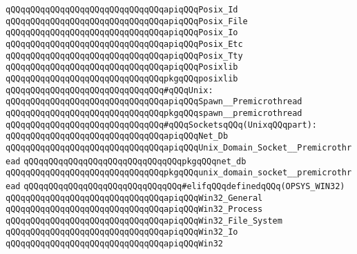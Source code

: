\verb|qQQqqQQqqQQqqQQqqQQqqQQqqQQqqQQqapiqQQqPosix_Id|\newline
\verb|qQQqqQQqqQQqqQQqqQQqqQQqqQQqqQQqapiqQQqPosix_File|\newline
\verb|qQQqqQQqqQQqqQQqqQQqqQQqqQQqqQQqapiqQQqPosix_Io|\newline
\verb|qQQqqQQqqQQqqQQqqQQqqQQqqQQqqQQqapiqQQqPosix_Etc|\newline
\verb|qQQqqQQqqQQqqQQqqQQqqQQqqQQqqQQqapiqQQqPosix_Tty|\newline
\verb|qQQqqQQqqQQqqQQqqQQqqQQqqQQqqQQqapiqQQqPosixlib|\newline
\newline
\verb|qQQqqQQqqQQqqQQqqQQqqQQqqQQqqQQqpkgqQQqposixlib|\newline
\newline
\verb|qQQqqQQqqQQqqQQqqQQqqQQqqQQqqQQq#qQQqUnix:|\newline
\verb|qQQqqQQqqQQqqQQqqQQqqQQqqQQqqQQqapiqQQqSpawn__Premicrothread|\newline
\verb|qQQqqQQqqQQqqQQqqQQqqQQqqQQqqQQqpkgqQQqspawn__premicrothread|\newline
\newline
\verb|qQQqqQQqqQQqqQQqqQQqqQQqqQQqqQQq#qQQqSocketsqQQq(UnixqQQqpart):|\newline
\verb|qQQqqQQqqQQqqQQqqQQqqQQqqQQqqQQqapiqQQqNet_Db|\newline
\verb|qQQqqQQqqQQqqQQqqQQqqQQqqQQqqQQqapiqQQqUnix_Domain_Socket__Premicrothread|\newline
\newline
\verb|qQQqqQQqqQQqqQQqqQQqqQQqqQQqqQQqpkgqQQqnet_db|\newline
\verb|qQQqqQQqqQQqqQQqqQQqqQQqqQQqqQQqpkgqQQqunix_domain_socket__premicrothread|\newline
\newline
\verb|qQQqqQQqqQQqqQQqqQQqqQQqqQQqqQQq#elifqQQqdefinedqQQq(OPSYS_WIN32)|\newline
\newline
\newline
\verb|qQQqqQQqqQQqqQQqqQQqqQQqqQQqqQQqapiqQQqWin32_General|\newline
\verb|qQQqqQQqqQQqqQQqqQQqqQQqqQQqqQQqapiqQQqWin32_Process|\newline
\verb|qQQqqQQqqQQqqQQqqQQqqQQqqQQqqQQqapiqQQqWin32_File_System|\newline
\verb|qQQqqQQqqQQqqQQqqQQqqQQqqQQqqQQqapiqQQqWin32_Io|\newline
\verb|qQQqqQQqqQQqqQQqqQQqqQQqqQQqqQQqapiqQQqWin32|\newline
